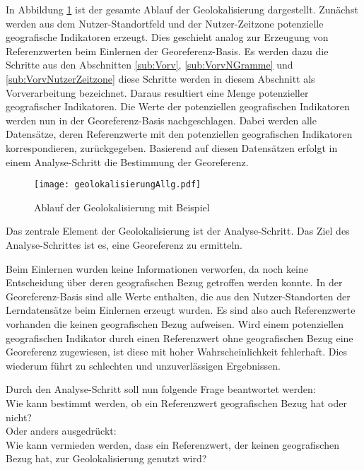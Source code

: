 		In Abbildung \ref{img:ablaufGeolok} ist der gesamte Ablauf der Geolokalisierung dargestellt.
		Zunächst werden aus dem Nutzer-Standortfeld und der Nutzer-Zeitzone potenzielle geografische Indikatoren erzeugt.
		Dies geschieht analog zur Erzeugung von Referenzwerten beim Einlernen der Georeferenz-Basis.
		Es werden dazu die Schritte aus den Abschnitten \ref{sub:Vorv}, \ref{sub:VorvNGramme} und \ref{sub:VorvNutzerZeitzone} diese Schritte werden in diesem Abschnitt als Vorverarbeitung bezeichnet.
		Daraus resultiert eine Menge potenzieller geografischer Indikatoren.
		Die Werte der potenziellen geografischen Indikatoren werden nun in der Georeferenz-Basis nachgeschlagen. 
		Dabei werden alle Datensätze, deren Referenzwerte mit den potenziellen geografischen Indikatoren korrespondieren, zurückgegeben.
		Basierend auf diesen Datensätzen erfolgt in einem Analyse-Schritt die Bestimmung der Georeferenz.

			\begin{figure} 
			\begin{center}
						\texttt{[image: geolokalisierungAllg.pdf]}
						\caption{Ablauf der Geolokalisierung mit Beispiel}
						\label{img:ablaufGeolok}
					\end{center}
			\end{figure}	

		Das zentrale Element der Geolokalisierung ist der Analyse-Schritt. 
		Das Ziel des Analyse-Schrittes ist es, eine Georeferenz zu ermitteln.
	
		Beim Einlernen wurden keine Informationen verworfen, da noch keine Entscheidung über deren geografischen Bezug getroffen werden konnte.
		In der Georeferenz-Basis sind alle Werte enthalten, die aus den Nutzer-Standorten der Lerndatensätze beim Einlernen erzeugt wurden.
		Es sind also auch Referenzwerte vorhanden die keinen geografischen Bezug aufweisen.
		Wird einem potenziellen geografischen Indikator durch einen Referenzwert ohne geografischen Bezug eine Georeferenz zugewiesen, ist diese mit hoher Wahrscheinlichkeit fehlerhaft.
		Dies wiederum führt zu schlechten und unzuverlässigen Ergebnissen.

		Durch den Analyse-Schritt soll nun folgende Frage beantwortet werden: 
		\\ Wie kann bestimmt werden, ob ein Referenzwert geografischen Bezug hat oder nicht? \\
		Oder anders ausgedrückt: 
		\\ Wie kann vermieden werden, dass ein Referenzwert, der keinen geografischen Bezug hat, zur Geolokalisierung genutzt wird?

